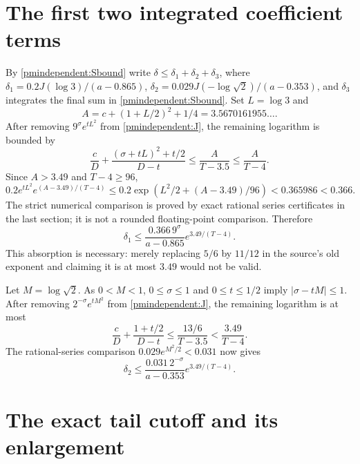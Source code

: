 \section{The first two integrated coefficient terms}

By \eqref{pmindependent:Sbound} write $\delta\le\delta_1+\delta_2+\delta_3$,
where $\delta_1=0.2J(\log3)/(a-0.865)$,
$\delta_2=0.029J(-\log\sqrt2)/(a-0.353)$, and $\delta_3$
integrates the final sum in \eqref{pmindependent:Sbound}.
Set $L=\log3$ and
\[
 A=c+(1+L/2)^2+1/4=3.5670161955\ldots.
\]
After removing $9^\sigma e^{tL^2}$ from \eqref{pmindependent:J}, the remaining
logarithm is bounded by
\[
 \frac cD+\frac{(\sigma+tL)^2+t/2}{D-t}
 \le\frac A{T-3.5}\le\frac A{T-4}.
\]
Since $A>3.49$ and $T-4\ge96$,
\[
 0.2e^{tL^2}e^{(A-3.49)/(T-4)}
 \le0.2\exp\!\left(L^2/2+(A-3.49)/96\right)
 <0.365986<0.366.
\]
The strict numerical comparison is proved by exact rational series
certificates in the last section; it is not a rounded floating-point
comparison. Therefore
\begin{equation}\label{pmindependent:deltaone}
 \delta_1\le\frac{0.366\,9^\sigma}{a-0.865}e^{3.49/(T-4)}.
\end{equation}
This absorption is necessary: merely replacing $5/6$ by $11/12$
in the source's old exponent and claiming it is at most $3.49$
would not be valid.

Let $M=\log\sqrt2$. As $0<M<1$, $0\le\sigma\le1$ and
$0\le t\le1/2$ imply $|\sigma-tM|\le1$. After removing
$2^{-\sigma}e^{tM^2}$ from \eqref{pmindependent:J}, the remaining logarithm
is at most
\[
 \frac cD+\frac{1+t/2}{D-t}
 \le\frac{13/6}{T-3.5}<\frac{3.49}{T-4}.
\]
The rational-series comparison $0.029e^{M^2/2}<0.031$ now gives
\begin{equation}\label{pmindependent:deltatwo}
 \delta_2\le\frac{0.031\,2^{-\sigma}}{a-0.353}e^{3.49/(T-4)}.
\end{equation}

\section{The exact tail cutoff and its enlargement}


